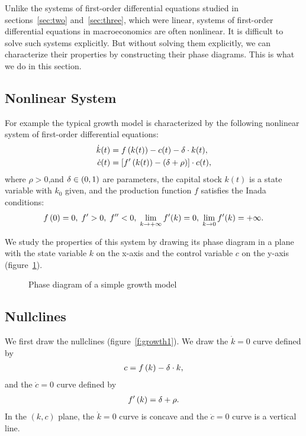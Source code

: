 \documentclass[letterpaper,12pt,leqno]{article}
\newcommand{\pdf}{phasediagrams.pdf}
\begin{document}
Unlike the systems of first-order differential equations studied in sections~\ref{sec:two} and~\ref{sec:three}, which were linear, systems of first-order differential equations in macroeconomics are often nonlinear. It is difficult to solve such systems explicitly. But without solving them explicitly, we can characterize their properties by constructing their phase diagrams. This is what we do in this section.

\subsection{Nonlinear System}

For example the typical growth model is characterized by the following nonlinear system of first-order differential equations:
\begin{align}
\dot{k}(t) &=f\left( k(t) \right) -c(t)-\delta \cdot k(t),  \label{eq:growth1} \\
\dot{c}(t) &=\left[ f'\left( k(t) \right) -\left( \delta+\rho \right) \right]\cdot c(t), \label{eq:growth2}
\end{align}
where $\rho >0$,and $\delta \in \left( 0,1 \right)$ are parameters, the capital stock $k(t)$ is a state variable
with $k_{0}$ given, and the production function $f$ satisfies the Inada conditions:
\begin{align*}
f\left( 0 \right)=0,\; f'>0,\;f''<0,\;\lim_{k\to +\infty}f'(k)=0,\;\lim_{k\to 0}f'(k) =+\infty.
\end{align*}

We study the properties of this system by drawing its phase diagram in a plane with the state variable $k$ on the x-axis and the control variable $c$ on the y-axis (figure~\ref{f:growth}).

\begin{figure}[p]
\hfill
{}\vfig
{}\hfill
{}
\caption{Phase diagram of a simple growth model}
\label{f:growth}\end{figure}

\subsection{Nullclines}

We first draw the nullclines (figure~\ref{f:growth1}). We draw the $\dot{k}=0$ curve defined by
\begin{align*}
c=f\left( k \right) -\delta\cdot k,
\end{align*}
and the $\dot{c}=0$ curve defined by
\begin{align*}
f^{\prime}\left( k \right) =\delta +\rho.
\end{align*}
In the $(k,c)$ plane, the $\dot{k}=0$ curve is concave and the $\dot{c}=0$ curve is a vertical line.
\end{document}
